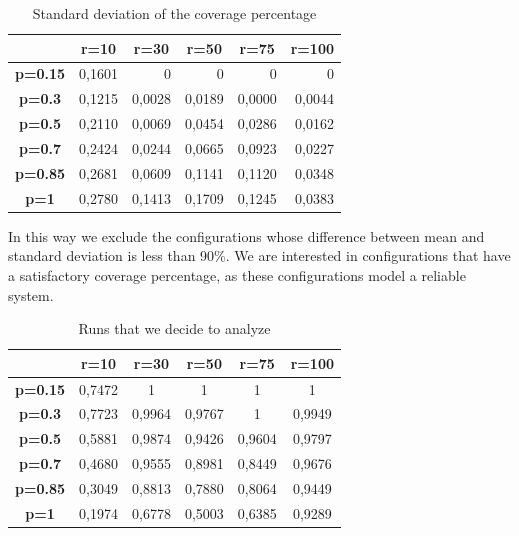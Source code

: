 \begin{table}[H]
\centering
\begin{tabular}{|c|r|r|r|r|r|}
\hline
 & \multicolumn{1}{c|}{\textbf{r=10}} & \multicolumn{1}{c|}{\textbf{r=30}} & \multicolumn{1}{c|}{\textbf{r=50}} & \multicolumn{1}{c|}{\textbf{r=75}} & \multicolumn{1}{c|}{\textbf{r=100}} \\ \hline
\textbf{p=0.15} & 0,1601 & 0 & 0 & 0 & 0 \\ \hline
\textbf{p=0.3} & 0,1215 & 0,0028 & 0,0189 & 0,0000 & 0,0044 \\ \hline
\textbf{p=0.5} & 0,2110 & 0,0069 & 0,0454 & 0,0286 & 0,0162 \\ \hline
\textbf{p=0.7} & 0,2424 & 0,0244 & 0,0665 & 0,0923 & 0,0227 \\ \hline
\textbf{p=0.85} & 0,2681 & 0,0609 & 0,1141 & 0,1120 & 0,0348 \\ \hline
\textbf{p=1} & 0,2780 & 0,1413 & 0,1709 & 0,1245 & 0,0383 \\ \hline
\end{tabular}
\caption{Standard deviation of the coverage percentage}
\label{tab:std-coverage-percentage}
\end{table}

In this way we exclude the configurations whose difference between mean and standard deviation is less than 90\%. We are interested in configurations that have a satisfactory coverage percentage, as these configurations model a reliable system.

\begin{table}[H]
\centering
\begin{tabular}{|c|c|c|c|c|c|}
\hline
 & \textbf{r=10} & \textbf{r=30} & \textbf{r=50} & \textbf{r=75} & \textbf{r=100} \\ \hline
\textbf{p=0.15} & 0,7472 & \cellcolor[HTML]{92D050}1 & \cellcolor[HTML]{92D050}1 & \cellcolor[HTML]{92D050}1 & \cellcolor[HTML]{92D050}1 \\ \hline
\textbf{p=0.3} & 0,7723 & \cellcolor[HTML]{92D050}0,9964 & \cellcolor[HTML]{92D050}0,9767 & \cellcolor[HTML]{92D050}1 & \cellcolor[HTML]{92D050}0,9949 \\ \hline
\textbf{p=0.5} & 0,5881 & \cellcolor[HTML]{92D050}0,9874 & \cellcolor[HTML]{92D050}0,9426 & \cellcolor[HTML]{92D050}0,9604 & \cellcolor[HTML]{92D050}0,9797 \\ \hline
\textbf{p=0.7} & 0,4680 & \cellcolor[HTML]{92D050}0,9555 & 0,8981 & 0,8449 & \cellcolor[HTML]{92D050}0,9676 \\ \hline
\textbf{p=0.85} & 0,3049 & 0,8813 & 0,7880 & 0,8064 & \cellcolor[HTML]{92D050}0,9449 \\ \hline
\textbf{p=1} & 0,1974 & 0,6778 & 0,5003 & 0,6385 & \cellcolor[HTML]{92D050}0,9289 \\ \hline
\end{tabular}
\caption{Runs that we decide to analyze}
\label{tab:run-to-analyze}
\end{table}

